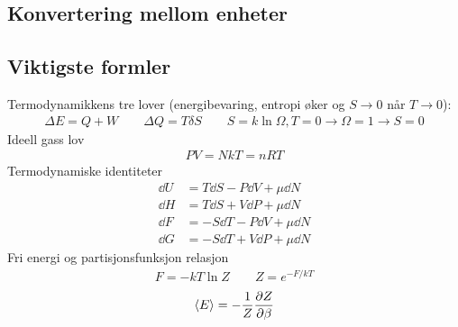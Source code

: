 \documentclass[12pt]{article}
\newcommand{\mean}[1]{\langle #1 \rangle}
\begin{document}
\subsection{Konvertering mellom enheter}

\subsection{Viktigste formler}
Termodynamikkens tre lover (energibevaring, entropi øker og $S \rightarrow 0$ når $T \rightarrow 0$):
\begin{align*}
  \Delta E = Q + W \qquad \Delta{Q} = T \delta{S} \qquad S = k \ln{\Omega}, T = 0 \rightarrow \Omega = 1 \rightarrow S = 0
\end{align*}
Ideell gass lov
\begin{align*}
  PV = NkT = nRT
\end{align*}
Termodynamiske identiteter
\begin{align*}
  \dd U &= T \dd S - P \dd V + \mu \dd N \\
  \dd H &= T \dd S + V \dd P + \mu \dd N \\
  \dd F &= -S \dd T - P \dd V + \mu \dd N \\
  \dd G &= -S \dd T + V \dd P + \mu \dd N
\end{align*}
Fri energi og partisjonsfunksjon relasjon
\begin{align*}
  F = -kT \ln{Z} \qquad Z = e^{-F/kT}
\end{align*}
\begin{align*}
  \mean{E} = - \frac{1}{Z} \pdv{Z}{\beta}
\end{align*}
\end{document}
